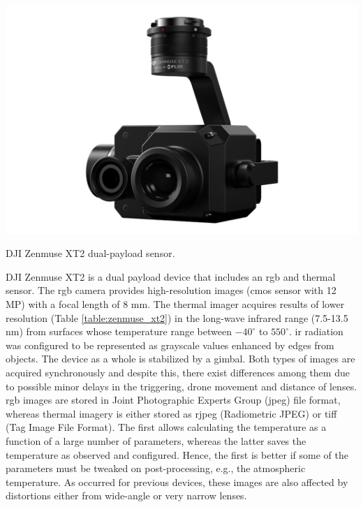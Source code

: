 \begin{marginfigure}[.1cm]
	\includegraphics{figs/materials/zenmuse_xt2.png}
	\caption{DJI Zenmuse XT2 dual-payload sensor.}
	\label{fig:zenmuse_xt2}
\end{marginfigure}
DJI Zenmuse XT2 is a dual payload device that includes an \acrshort{rgb} and thermal sensor. The \acrshort{rgb} camera provides high-resolution images (\acrshort{cmos} sensor with 12 MP) with a focal length of 8 \si{\milli\meter}. The thermal imager acquires results of lower resolution (Table \ref{table:zenmuse_xt2}) in the long-wave infrared range (7.5-13.5 \si{\nano\meter}) from surfaces whose temperature range between $-40^\circ$ to $550^\circ$. \acrshort{ir} radiation was configured to be represented as grayscale values enhanced by edges from objects. The device as a whole is stabilized by a gimbal. Both types of images are acquired synchronously and despite this, there exist differences among them due to possible minor delays in the triggering, drone movement and distance of lenses. \acrshort{rgb} images are stored in Joint Photographic Experts Group (\acrshort{jpeg}) file format, whereas thermal imagery is either stored as \acrshort{rjpeg} (Radiometric JPEG) or \acrshort{tiff} (Tag Image File Format). The first allows calculating the temperature as a function of a large number of parameters, whereas the latter saves the temperature as observed and configured. Hence, the first is better if some of the parameters must be tweaked on post-processing, e.g., the atmospheric temperature. As occurred for previous devices, these images are also affected by distortions either from wide-angle or very narrow lenses.

